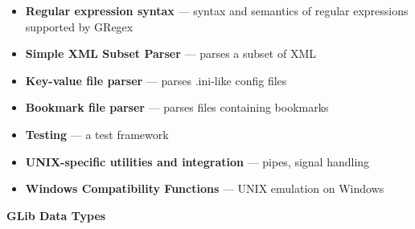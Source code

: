 \documentclass[12pt]{article}
\begin{document}
\begin{itemize}
\begin{itemize}
\item \textbf{Regular expression syntax} — syntax and semantics of regular expressions supported by GRegex
\item \textbf{Simple XML Subset Parser} — parses a subset of XML
\item \textbf{Key-value file parser} — parses .ini-like config files
\item \textbf{Bookmark file parser} — parses files containing bookmarks
\item \textbf{Testing} — a test framework
\item \textbf{UNIX-specific utilities and integration} — pipes, signal handling
\item \textbf{Windows Compatibility Functions} — UNIX emulation on Windows





\end{itemize}

\textbf{GLib Data Types}
\begin{itemize}



\end{itemize}
\end{itemize}
\end{document}
